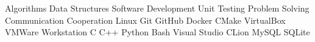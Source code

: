 
\begin{cventries}
    \cventryii
        {Algorithms \cvseparator Data Structures \cvseparator Software Development \cvseparator Unit Testing}
        {}
    \cventryii
        {Problem Solving \cvseparator Communication \cvseparator Cooperation}
        {}
    \cventryii
        {Linux \cvseparator Git \cvseparator GitHub \cvseparator Docker \cvseparator CMake}
        {}
    \cventryii
        {VirtualBox \cvseparator VMWare Workstation}
        {}
    \cventryii
        {C \cvseparator C++ \cvseparator Python \cvseparator Bash}
        {}
    \cventryii
        {Visual Studio \cvseparator CLion}
        {}
    \cventryii
        {MySQL \cvseparator SQLite}
        {}
\end{cventries}
